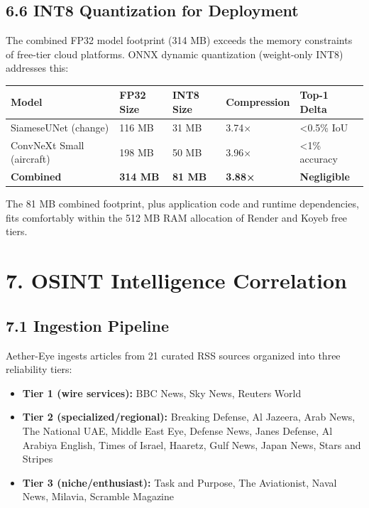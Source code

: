\documentclass[11pt,a4paper]{article}
\providecommand{\tightlist}{\setlength{\itemsep}{0pt}\setlength{\parskip}{0pt}}
\begin{document}
\hypertarget{int8-quantization-for-deployment}{%
\subsection{6.6 INT8 Quantization for Deployment}\label{int8-quantization-for-deployment}}

The combined FP32 model footprint (314 MB) exceeds the memory constraints of free-tier cloud platforms. ONNX dynamic quantization (weight-only INT8) addresses this:

\begin{longtable}[]{@{}lllll@{}}
\toprule\noalign{}
Model & FP32 Size & INT8 Size & Compression & Top-1 Delta \\
\midrule\noalign{}
\endhead
\bottomrule\noalign{}
\endlastfoot
SiameseUNet (change) & 116 MB & 31 MB & 3.74× & \textless0.5\% IoU \\
ConvNeXt Small (aircraft) & 198 MB & 50 MB & 3.96× & \textless1\% accuracy \\
\textbf{Combined} & \textbf{314 MB} & \textbf{81 MB} & \textbf{3.88×} & \textbf{Negligible} \\
\end{longtable}

The 81 MB combined footprint, plus application code and runtime dependencies, fits comfortably within the 512 MB RAM allocation of Render and Koyeb free tiers.

\hypertarget{osint-intelligence-correlation}{%
\section{7. OSINT Intelligence Correlation}\label{osint-intelligence-correlation}}

\hypertarget{ingestion-pipeline}{%
\subsection{7.1 Ingestion Pipeline}\label{ingestion-pipeline}}

Aether-Eye ingests articles from 21 curated RSS sources organized into three reliability tiers:

\begin{itemize}
\tightlist
\item
  \textbf{Tier 1 (wire services):} BBC News, Sky News, Reuters World
\item
  \textbf{Tier 2 (specialized/regional):} Breaking Defense, Al Jazeera, Arab News, The National UAE, Middle East Eye, Defense News, Janes Defense, Al Arabiya English, Times of Israel, Haaretz, Gulf News, Japan News, Stars and Stripes
\item
  \textbf{Tier 3 (niche/enthusiast):} Task and Purpose, The Aviationist, Naval News, Milavia, Scramble Magazine
\end{itemize}
\end{document}
